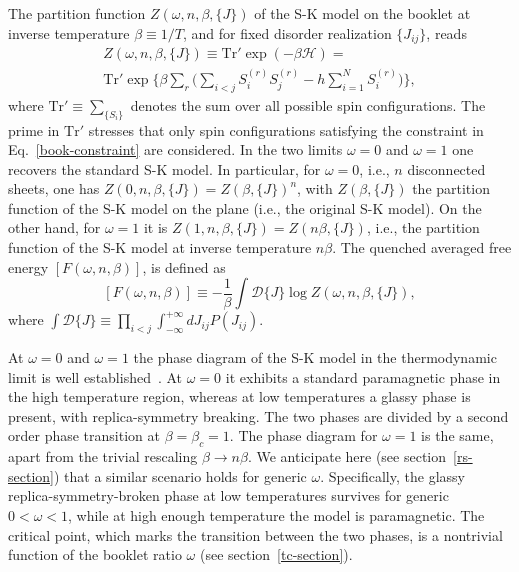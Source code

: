 \documentclass[twocolumn,superscriptaddress,prb,10pt]{revtex4-1}
\begin{document}
The partition function $Z(\omega,n,\beta,\{J\})$ of the S-K model on the booklet 
at inverse temperature $\beta\equiv 1/T$, and for fixed disorder realization 
$\{J_{ij}\}$, reads 
%
\begin{multline}
Z(\omega,n,\beta,\{J\})\equiv\textrm{Tr}'\exp(-\beta{\mathcal H})=\\
\textrm{Tr}'\exp\Big\{\beta\sum\limits_{r}\Big(
\sum\limits_{i<j}S^{(r)}_i 
S^{(r)}_j-h\sum\limits_{i=1}^NS^{(r)}_i\Big)\Big\},
\label{book-pf}
\end{multline}
%
where $\textrm{Tr}'\equiv \sum_{\{S_i\}}$ denotes the sum over all possible 
spin configurations. The prime in $\textrm{Tr}'$ stresses that only spin configurations 
satisfying the constraint in Eq.~\eqref{book-constraint} are considered. In the two limits 
$\omega=0$ and $\omega=1$ one recovers the standard S-K model. In particular, for $\omega=0$, 
i.e., $n$ disconnected sheets, one has $Z(0,n,\beta,\{J\})=Z(\beta,\{J\})^n$, with 
$Z(\beta,\{J\})$ the partition function of the S-K model on the plane (i.e., the original 
S-K model). On the other hand, 
for $\omega=1$ it is $Z(1,n,\beta,\{J\})=Z(n\beta,\{J\})$, i.e., the partition function 
of the S-K model at inverse temperature $n\beta$. The quenched averaged free energy 
$[F(\omega,n,\beta)]$, is defined as 
%
\begin{equation}
\label{free-energy}
[F(\omega,n,\beta)]\equiv -\frac{1}{\beta}\int {\mathcal D}\{J\}
\log Z(\omega,n,\beta,\{J\}), 
\end{equation}
%
where $\int{\mathcal D}\{J\}\equiv\prod\nolimits_{i<j}\int_{-\infty}^{
+\infty}dJ_{ij}P(J_{ij})$. 

At $\omega=0$ and $\omega=1$ the phase diagram of the S-K model in the 
thermodynamic limit is well established~\cite{parisi-book,nishimori-book}. 
At $\omega=0$ it exhibits a standard paramagnetic phase in the high temperature 
region, whereas at low temperatures a glassy phase is present, with replica-symmetry 
breaking. The two phases are divided by a second order phase transition at 
$\beta=\beta_c=1$. The phase diagram for $\omega=1$ is the same, apart from the 
trivial rescaling $\beta\to n\beta$. We anticipate here (see section~\ref{rs-section}) 
that a similar scenario holds for generic $\omega$. Specifically, the glassy 
replica-symmetry-broken phase at low temperatures survives for generic 
$0<\omega<1$, while at high enough temperature the model is paramagnetic. The 
critical point, which marks the transition between the two phases, is a 
nontrivial function of the booklet ratio $\omega$ (see section~\ref{tc-section}). 
\end{document}
